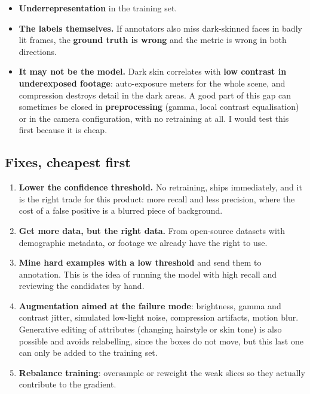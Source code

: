 \documentclass[11pt,a4paper]{article}
\begin{document}
\begin{itemize}
  \item \textbf{Underrepresentation} in the training set.
  \item \textbf{The labels themselves.} If annotators also miss dark-skinned faces in
    badly lit frames, the \textbf{ground truth is wrong} and the metric is wrong in both
    directions.
  \item \textbf{It may not be the model.} Dark skin correlates with \textbf{low contrast in
    underexposed footage}: auto-exposure meters for the whole scene, and compression destroys
    detail in the dark areas. A good part of this gap can sometimes be closed in
    \textbf{preprocessing} (gamma, local contrast equalisation) or in the camera
    configuration, with no retraining at all. I would test this first because it is cheap.
\end{itemize}

\subsection*{Fixes, cheapest first}

\begin{enumerate}
  \item \textbf{Lower the confidence threshold.} No retraining, ships immediately, and it is
    the right trade for this product: more recall and less precision, where the cost of a
    false positive is a blurred piece of background.
  \item \textbf{Get more data, but the right data.} From open-source datasets with demographic metadata, or footage we already have the right to use.
  \item \textbf{Mine hard examples with a low threshold} and send them to annotation. This is
    the idea of running the model with high recall and reviewing the candidates by hand.
  \item \textbf{Augmentation aimed at the failure mode}: brightness, gamma and contrast
    jitter, simulated low-light noise, compression artifacts, motion blur. Generative editing
    of attributes (changing hairstyle or skin tone) is also possible and avoids relabelling,
    since the boxes do not move, but this last one can only be added to the training set.
  \item \textbf{Rebalance training}: oversample or reweight the weak slices so they actually
    contribute to the gradient.
\end{enumerate}
\end{document}
